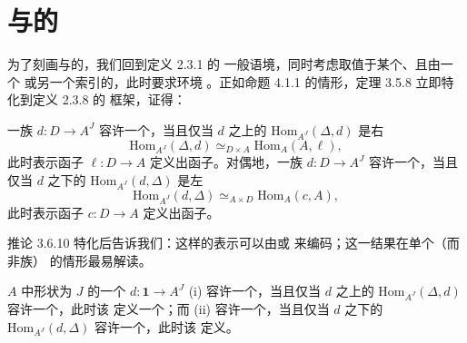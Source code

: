 \providecommand{\qcOne}{\mathbf{1}}   %
\providecommand{\qcor}[1]{\ulcorner#1\urcorner}   %
\providecommand{\ShapeSpan}{\sqcap}    %
\providecommand{\ShapeCospan}{\sqcup}  %
\providecommand{\ShapeSquare}{\square} %

\section{\trLimit{}与\trColimit{}的\trUniversalProperty}\label{sec:universal-property-of-limits-and-colimits}

为了刻画\trLimit{}与\trColimit{}的\trUniversalProperty{}，我们回到定义 2.3.1 的
一般语境，同时考虑取值于某个\trInfinityCategory{}、且由一个\trSimplicialSet{}%
或另一个\trInfinityCategory{}索引的\trDiagram{}，此时要求环境\trInfinityCosmos{}%
\trCartesianClosed{}。正如命题 4.1.1 的情形，定理 3.5.8 立即特化到定义 2.3.8 的
框架，证得：

\begin{proposition}[余/极限表示锥]\label{prop:colimits-represent-cones}
一族\trDiagram{} $d\colon D\to A^{J}$ 容许一个\trLimit{}，当且仅当 $d$ 之上的%
\trInfinityCategoryOfCones{} $\mathrm{Hom}_{A^{J}}(\Delta,d)$ 是右\trRepresentable
\begin{equation*}
\mathrm{Hom}_{A^{J}}(\Delta,d)\simeq_{D\times A}\mathrm{Hom}_{A}(A,\ell),
\end{equation*}
此时表示函子 $\ell\colon D\to A$ 定义出\trLimit{}函子。对偶地，一族\trDiagram{}
$d\colon D\to A^{J}$ 容许一个\trColimit{}，当且仅当 $d$ 之下的%
\trInfinityCategoryOfCones{} $\mathrm{Hom}_{A^{J}}(d,\Delta)$ 是左\trRepresentable
\begin{equation*}
\mathrm{Hom}_{A^{J}}(d,\Delta)\simeq_{A\times D}\mathrm{Hom}_{A}(c,A),
\end{equation*}
此时表示函子 $c\colon D\to A$ 定义出\trColimit{}函子。
\end{proposition}

推论 3.6.10 特化后告诉我们：这样的表示可以由\trTerminal{}\trElement{}或%
\trInitial{}\trElement{}来编码；这一结果在单个\trDiagram{}（而非\trDiagram{}族）
的情形最易解读。

\begin{proposition}\label{prop:limits-as-terminal-cones}
\trInfinityCategory{} $A$ 中形状为 $J$ 的一个\trDiagram{} $d\colon\qcOne\to A^{J}$
(i) 容许一个\trLimit{}，当且仅当 $d$ 之上的\trInfinityCategoryOfCones{}
$\mathrm{Hom}_{A^{J}}(\Delta,d)$ 容许一个\trTerminal{}\trElement{}，此时该%
\trTerminal{}\trElement{}定义一个\trLimit\trCone{}；而
(ii) 容许一个\trColimit{}，当且仅当 $d$ 之下的\trInfinityCategoryOfCones{}
$\mathrm{Hom}_{A^{J}}(d,\Delta)$ 容许一个\trInitial{}\trElement{}，此时该%
\trInitial{}\trElement{}定义\trColimit\trCone{}。
\end{proposition}

